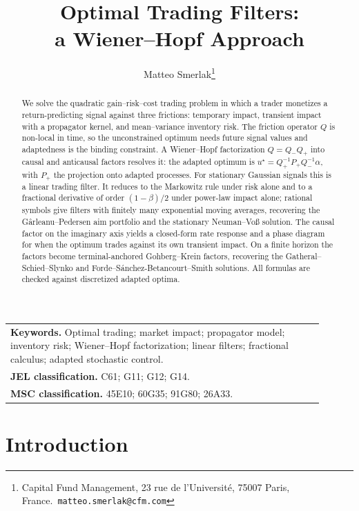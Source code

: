 \documentclass[11pt]{article}
\title{Optimal Trading Filters:\\ a Wiener--Hopf Approach}
\author{Matteo Smerlak\thanks{Capital Fund Management, 23 rue de l'Universit\'e, 75007 Paris, France.\ \texttt{matteo.smerlak@cfm.com}}}
\date{}
\theoremstyle{plain}
\begin{document}
\maketitle

\begin{center}
\begin{tabular}{p{0.9\linewidth}}
\textbf{Keywords.} Optimal trading; market impact; propagator model; inventory risk; Wiener--Hopf factorization; linear filters; fractional calculus; adapted stochastic control.\\[2pt]
\textbf{JEL classification.} C61; G11; G12; G14.\\[2pt]
\textbf{MSC classification.} 45E10; 60G35; 91G80; 26A33.
\end{tabular}
\end{center}

\begin{abstract}
We solve the quadratic gain--risk--cost trading problem in which a trader monetizes a return-predicting signal against three frictions: temporary impact, transient impact with a propagator kernel, and mean--variance inventory risk. The friction operator $Q$ is non-local in time, so the unconstrained optimum needs future signal values and adaptedness is the binding constraint. A Wiener--Hopf factorization $Q=Q_-Q_+$ into causal and anticausal factors resolves it: the adapted optimum is $u^\star = Q_+^{-1}P_+Q_-^{-1}\alpha$, with $P_+$ the projection onto adapted processes. For stationary Gaussian signals this is a linear trading filter. It reduces to the Markowitz rule under risk alone and to a fractional derivative of order $(1-\beta)/2$ under power-law impact alone; rational symbols give filters with finitely many exponential moving averages, recovering the G\^arleanu--Pedersen aim portfolio and the stationary Neuman--Vo\ss{} solution. The causal factor on the imaginary axis yields a closed-form rate response and a phase diagram for when the optimum trades against its own transient impact. On a finite horizon the factors become terminal-anchored Gohberg--Krein factors, recovering the Gatheral--Schied--Slynko and Forde--S\'anchez-Betancourt--Smith solutions. All formulas are checked against discretized adapted optima.
\end{abstract}

\section{Introduction}
\end{document}
